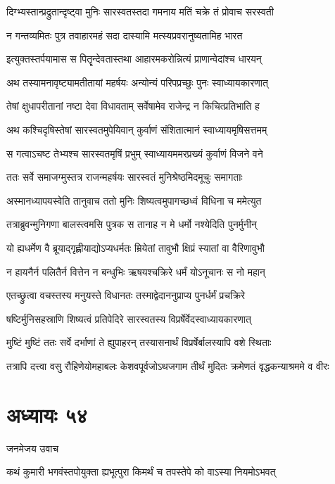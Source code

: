 \twolineshloka
{दिग्भ्यस्तान्प्रद्रुतान्दृष्ट्वा मुनिः सारस्वतस्तदा}
{गमनाय मतिं चक्रे तं प्रोवाच सरस्वती}


\twolineshloka
{न गन्तव्यमितः पुत्र तवाहारमहं सदा}
{दास्यामि मत्स्यप्रवरानुष्यतामिह भारत}


\twolineshloka
{इत्युक्तस्तर्पयामास स पितॄन्देवतास्तथा}
{आहारमकरोन्नित्यं प्राणान्वेदांश्च धारयन्}


\twolineshloka
{अथ तस्यामनावृष्ट्यामतीतायां महर्षयः}
{अन्योन्यं परिपप्रच्छुः पुनः स्वाध्यायकारणात्}


\twolineshloka
{तेषां क्षुधापरीतानां नष्टा देवा विधावताम्}
{सर्वेषामेव राजेन्द्र न किचित्प्रतिभाति ह}


\twolineshloka
{अथ कश्चिदृषिस्तेषां सारस्वतमुपेयिवान्}
{कुर्वाणं संशितात्मानं स्वाध्यायमृषिसत्तमम्}


\twolineshloka
{स गत्वाऽचष्ट तेभ्यश्च सारस्वतमृषिं प्रभुम्}
{स्वाध्यायममरप्रख्यं कुर्वाणं विजने वने}


\twolineshloka
{ततः सर्वे समाजग्मुस्तत्र राजन्महर्षयः}
{सारस्वतं मुनिश्रेष्ठमिदमूचुः समागताः}


\twolineshloka
{अस्मानध्यापयस्वेति तानुवाच ततो मुनिः}
{शिष्यत्वमुपागच्छध्वं विधिना च ममेत्युत}


\twolineshloka
{तत्राब्रुवन्मुनिगणा बालस्त्वमसि पुत्रक}
{स तानाह न मे धर्मो नश्येदिति पुनर्मुनीन्}


\twolineshloka
{यो ह्यधर्मेण वै ब्रूयाद्गृह्णीयाद्योऽप्यधर्मतः}
{म्रियेतां तावुभौ क्षिप्रं स्यातां वा वैरिणावुभौ}


\twolineshloka
{न हायनैर्न पलितैर्न वित्तेन न बन्धुभिः}
{ऋषयश्चक्रिरे धर्मं योऽनूचानः स नो महान्}


\twolineshloka
{एतच्छ्रुत्वा वचस्तस्य मनुयस्ते विधानतः}
{तस्माद्वेदाननुप्राप्य पुनर्धर्मं प्रचक्रिरे}


\twolineshloka
{षष्टिर्मुनिसहस्राणि शिष्यत्वं प्रतिपेदिरे}
{सारस्वतस्य विप्रर्षेर्वेदस्वाध्यायकारणात्}


\twolineshloka
{मुष्टिं मुष्टिं ततः सर्वे दर्भाणां ते ह्युपाहरन्}
{तस्यासनार्थं विप्रर्षेर्बालस्यापि वशे स्थिताः}


तत्रापि दत्त्वा वसु रौहिणेयोमहाबलः केशवपूर्वजोऽथजगाम तीर्थं मुदितः क्रमेणतं वृद्धकन्याश्रममे व वीरः
\chapter{अध्यायः ५४}
\twolineshloka
{जनमेजय उवाच}
{}


\twolineshloka
{कथं कुमारी भगवंस्तपोयुक्ता ह्यभूत्पुरा}
{किमर्थं च तपस्तेपे को वाऽस्या नियमोऽभवत्}



